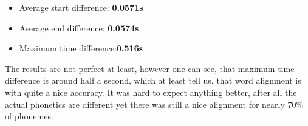 \documentclass[12pt,a4paper,english]{article}
\begin{document}
\begin{itemize}
    \item Average start difference: \textbf{ 0.0571s}
    \item Average end difference: \textbf{0.0574s}
    \item Maximum time difference:\textbf{0.516s}
\end{itemize}

The results are not perfect at least, however one can see, that maximum time difference is around half a second, which at least tell us, that word alignment is with quite a nice accuracy. \newline
It was hard to expect anything better, after all the actual phonetics are different yet there was still a nice alignment for nearly 70\% of phonemes.

\newpage
\end{document}
